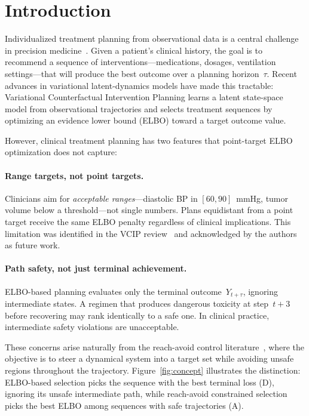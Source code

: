 \documentclass{article}
\begin{document}
\section{Introduction}
\label{sec:intro}

Individualized treatment planning from observational data is a central challenge in precision medicine~\citep{chakraborty2014dynamic, murphy2003optimal}. Given a patient's clinical history, the goal is to recommend a sequence of interventions---medications, dosages, ventilation settings---that will produce the best outcome over a planning horizon~$\tau$. Recent advances in variational latent-dynamics models have made this tractable: Variational Counterfactual Intervention Planning \citep[VCIP;][]{melnychuk2025vcip} learns a latent state-space model from observational trajectories and selects treatment sequences by optimizing an evidence lower bound (ELBO) toward a target outcome value.

However, clinical treatment planning has two features that point-target ELBO optimization does not capture:

\vspace{-0.8em}
\paragraph{Range targets, not point targets.} Clinicians aim for \emph{acceptable ranges}---diastolic BP in $[60, 90]$~mmHg, tumor volume below a threshold---not single numbers. Plans equidistant from a point target receive the same ELBO penalty regardless of clinical implications. This limitation was identified in the VCIP review~\citep{melnychuk2025vcip} and acknowledged by the authors as future work.

\vspace{-0.8em}
\paragraph{Path safety, not just terminal achievement.} ELBO-based planning evaluates only the terminal outcome~$Y_{t+\tau}$, ignoring intermediate states. A regimen that produces dangerous toxicity at step~$t{+}3$ before recovering may rank identically to a safe one. In clinical practice, intermediate safety violations are unacceptable.

These concerns arise naturally from the reach-avoid control literature~\citep{mitchell2005reach, fisac2015reach}, where the objective is to steer a dynamical system into a target set while avoiding unsafe regions throughout the trajectory. Figure~\ref{fig:concept} illustrates the distinction: ELBO-based selection picks the sequence with the best terminal loss (D), ignoring its unsafe intermediate path, while reach-avoid constrained selection picks the best ELBO among sequences with safe trajectories (A).
\end{document}
